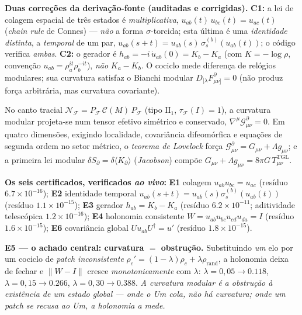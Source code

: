\documentclass[11pt]{article}
\theoremstyle{definition}\newtheorem{deriv}{Derivação}
\begin{document}
\textbf{Duas correções da derivação-fonte (auditadas e corrigidas).} \textbf{C1:} a lei de colagem espacial de três estados é \emph{multiplicativa}, $u_{ab}(t)\,u_{bc}(t)=u_{ac}(t)$ (\emph{chain rule} de Connes) --- \emph{não} a forma $\sigma$-torcida; esta última é uma \emph{identidade distinta}, a \emph{temporal} de um par, $u_{ab}(s{+}t)=u_{ab}(s)\,\sigma_s^{(b)}(u_{ab}(t))$; o código verifica \emph{ambas}. \textbf{C2:} o gerador é $h_{ab}=-i\,\dot u_{ab}(0)=K_b-K_a$ (com $K=-\log\rho$, convenção $u_{ab}=\rho_a^{it}\rho_b^{-it}$), \emph{não} $K_a-K_b$. O cociclo mede diferença de relógios modulares; sua curvatura satisfaz o Bianchi modular $D_{[\lambda}F^\partial_{\mu\nu]}=0$ (não produz força arbitrária, mas curvatura covariante).

No canto tracial $\mathcal N_{\mathcal F}=P_{\mathcal F}\,\mathcal C(M)\,P_{\mathcal F}$ (tipo $\mathrm{II}_1$, $\tau_{\mathcal F}(I)=1$), a curvatura modular projeta-se num tensor efetivo simétrico e conservado, $\nabla^\mu\mathcal G^\partial_{\mu\nu}=0$. Em quatro dimensões, exigindo localidade, covariância difeomórfica e equações de segunda ordem no setor métrico, o \emph{teorema de Lovelock} força $\mathcal G^\partial_{\mu\nu}=G_{\mu\nu}+\Lambda g_{\mu\nu}$; e a primeira lei modular $\delta S_\partial=\delta\langle K_\partial\rangle$ (\emph{Jacobson}) compõe $G_{\mu\nu}+\Lambda g_{\mu\nu}=8\pi G\,T^{\mathrm{TGL}}_{\mu\nu}$.

\textbf{Os seis certificados, verificados \emph{ao vivo}:} \textbf{E1} colagem $u_{ab}u_{bc}=u_{ac}$ (resíduo $6.7\times10^{-16}$); \textbf{E2} identidade temporal $u_{ab}(s{+}t)=u_{ab}(s)\sigma_s^{(b)}(u_{ab}(t))$ (resíduo $1.1\times10^{-15}$); \textbf{E3} gerador $h_{ab}=K_b-K_a$ (resíduo $6.2\times10^{-11}$; aditividade telescópica $1.2\times10^{-16}$); \textbf{E4} holonomia consistente $W=u_{ab}u_{bc}u_{cd}u_{da}=I$ (resíduo $1.6\times10^{-15}$); \textbf{E6} covariância global $U u_{ab}U^\dagger=u'$ (resíduo $1.8\times10^{-15}$).

\textbf{E5 --- o achado central: curvatura $=$ obstrução.} Substituindo \emph{um} elo por um cociclo de \emph{patch inconsistente} $\rho_c'=(1-\lambda)\rho_c+\lambda\rho_{\mathrm{rand}}$, a holonomia deixa de fechar e $\lVert W-I\rVert$ cresce \emph{monotonicamente} com $\lambda$: $\lambda{=}0{,}05\to0.118$, $\lambda{=}0{,}15\to0.266$, $\lambda{=}0{,}30\to0.388$. \emph{A curvatura modular é a obstrução à existência de um estado global --- onde o Um cola, não há curvatura; onde um patch se recusa ao Um, a holonomia a mede.}
\end{document}
